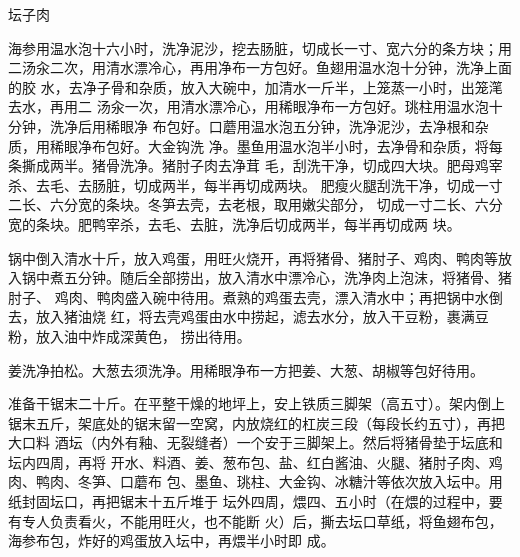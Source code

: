 \begin{recipe}{坛子肉}

\ingredients


\preparation

\step 海参用温水泡十六小时，洗净泥沙，挖去肠脏，切成长一寸、宽六分的条方块；用
二汤汆二次，用清水漂冷心，再用净布一方包好。鱼翅用温水泡十分钟，洗净上面的胶
水，去净子骨和杂质，放入大碗中，加清水一斤半，上笼蒸一小时，出笼滗去水，再用二
汤汆一次，用清水漂冷心，用稀眼净布一方包好。珧柱用温水泡十分钟，洗净后用稀眼净
布包好。口蘑用温水泡五分钟，洗净泥沙，去净根和杂质，用稀眼净布包好。大金钩洗
净。墨鱼用温水泡半小时，去净骨和杂质，将每条撕成两半。猪骨洗净。猪肘子肉去净茸
毛，刮洗干净，切成四大块。肥母鸡宰杀、去毛、去肠脏，切成两半，每半再切成两块。
肥瘦火腿刮洗干净，切成一寸二长、六分宽的条块。冬笋去壳，去老根，取用嫩尖部分，
切成一寸二长、六分宽的条块。肥鸭宰杀，去毛、去脏，洗净后切成两半，每半再切成两
块。

\step 锅中倒入清水十斤，放入鸡蛋，用旺火烧开，再将猪骨、猪肘子、鸡肉、鸭肉等放
入锅中煮五分钟。随后全部捞出，放入清水中漂冷心，洗净肉上泡沫，将猪骨、猪肘子、
鸡肉、鸭肉盛入碗中待用。煮熟的鸡蛋去壳，漂入清水中；再把锅中水倒去，放入猪油烧
红，将去壳鸡蛋由水中捞起，滤去水分，放入干豆粉，裹满豆粉，放入油中炸成深黄色，
捞出待用。

\step 姜洗净拍松。大葱去须洗净。用稀眼净布一方把姜、大葱、胡椒等包好待用。

\step 准备干锯末二十斤。在平整干燥的地坪上，安上铁质三脚架（高五寸）。架内倒上
锯末五斤，架底处的锯末留一空窝，内放烧红的杠炭三段（每段长约五寸），再把大口料
酒坛（内外有釉、无裂缝者）一个安于三脚架上。然后将猪骨垫于坛底和坛内四周，再将
开水、料酒、姜、葱布包、盐、红白酱油、火腿、猪肘子肉、鸡肉、鸭肉、冬笋、口蘑布
包、墨鱼、珧柱、大金钩、冰糖汁等依次放入坛中。用纸封固坛口，再把锯末十五斤堆于
坛外四周，煨四、五小时（在煨的过程中，要有专人负责看火，不能用旺火，也不能断
火）后，撕去坛口草纸，将鱼翅布包，海参布包，炸好的鸡蛋放入坛中，再煨半小时即
成。


\end{recipe}
